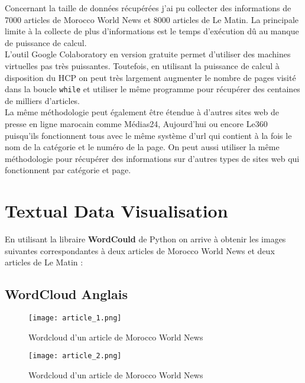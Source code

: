 \documentclass[a4paper,french,12pt]{article}
\begin{document}
Concernant la taille de données récupérées j'ai pu collecter des informations de 7000 articles de Morocco World News et 8000 articles de Le Matin. La principale limite à la collecte de plus d'informations est le temps d'exécution dû au manque de puissance de calcul.\\

L'outil Google Colaboratory en version gratuite permet d'utiliser des machines virtuelles pas très puissantes. Toutefois, en utilisant la puissance de calcul à disposition du HCP on peut très largement augmenter le nombre de pages visité dans la boucle \verb|while| et utiliser le même programme pour récupérer des centaines de milliers d'articles.\\

La même méthodologie peut également être étendue à d'autres sites web de presse en ligne marocain comme Médias24, Aujourd'hui ou encore Le360 puisqu'ils fonctionnent tous avec le même système d'url qui contient à la fois le nom de la catégorie et le numéro de la page. On peut aussi utiliser la même méthodologie pour récupérer des informations sur d'autres types de sites web qui fonctionnent par catégorie et page.

\section{Textual Data Visualisation}
\label{sec:Textual Data Visualisation}

En utilisant la libraire \textbf{WordCould} de Python on arrive à obtenir les images suivantes correspondantes à deux articles de Morocco World News et deux articles de Le Matin :

\hspace{50cm}

\subsection{WordCloud Anglais}

\begin{figure}[!h]
    \centering
    \texttt{[image: article\_1.png]}
    \caption{Wordcloud d'un article de Morocco World News}
\end{figure}

\hspace{50cm}

\begin{figure}[!h]
    \centering
    \texttt{[image: article\_2.png]}
    \caption{Wordcloud d'un article de Morocco World News}
\end{figure}
\end{document}

